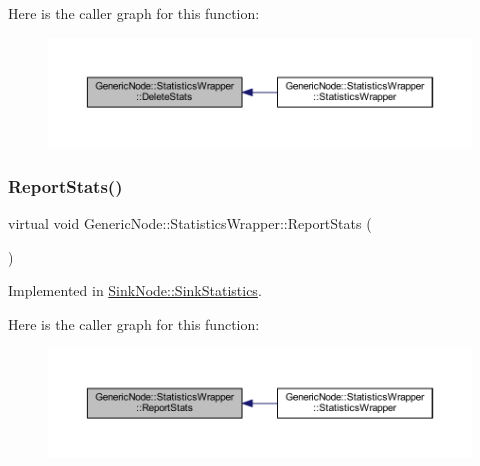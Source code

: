 Here is the caller graph for this function\+:
\nopagebreak
\begin{figure}[H]
\begin{center}
\leavevmode
\includegraphics[width=350pt]{class_generic_node_1_1_statistics_wrapper_a08f3642bccd77ccf4d7a8b7010559e1c_icgraph}
\end{center}
\end{figure}
\mbox{\label{class_generic_node_1_1_statistics_wrapper_a280ae59c2d5f64be5848335dc1b77c21}} 
\subsubsection{\texorpdfstring{Report\+Stats()}{ReportStats()}}
{\footnotesize\ttfamily virtual void Generic\+Node\+::\+Statistics\+Wrapper\+::\+Report\+Stats (\begin{DoxyParamCaption}{ }\end{DoxyParamCaption})\hspace{0.3cm}{\ttfamily [pure virtual]}}



Implemented in \hyperlink{class_sink_node_1_1_sink_statistics_a2b8337521bc63a06000571aaede60ad9}{Sink\+Node\+::\+Sink\+Statistics}.

Here is the caller graph for this function\+:
\nopagebreak
\begin{figure}[H]
\begin{center}
\leavevmode
\includegraphics[width=350pt]{class_generic_node_1_1_statistics_wrapper_a280ae59c2d5f64be5848335dc1b77c21_icgraph}
\end{center}
\end{figure}



